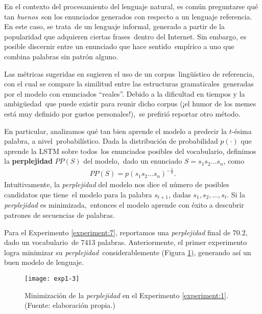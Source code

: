 En el contexto del procesamiento del lenguaje natural, es común preguntarse qué tan \emph{buenos}\
son los enunciados generados con respecto a un lenguaje referencia. En este caso, se trata\
de un lenguaje informal, generado a partir de la popularidad que adquieren ciertas frases\
dentro del Internet. Sin embargo, es posible discernir entre un enunciado que hace sentido\
empírico a uno que combina palabras sin patrón alguno.\par
Las métricas sugeridas en \cite{DBLP:journals/corr/VinyalsTBE16} sugieren el uso de un corpus\
lingüístico de referencia, con el cual se compare la similitud entre las estructuras gramaticales\
generadas por el modelo con enunciados ``reales''. Debido a la dificultad en tiempos y la ambigüedad\
que puede existir para reunir dicho corpus (¡el humor de los memes está muy definido por gustos personales!),\
se prefirió reportar otro método.\par
En particular, analizamos qué tan bien aprende el modelo a predecir la $t$-ésima palabra, a nivel\
probabilístico. Dada la distribución de probabilidad $p(\cdot)$ que aprende la LSTM sobre todos\
los enunciados posibles del vocabulario, definimos la \textbf{perplejidad} $PP(S)$ del modelo,\
dado un enunciado $S = s_1 s_2 \ldots s_n$, como
\begin{align}
  PP(S) = p(s_1 s_2 \ldots s_n) ^{-\frac{1}{n}}.
\end{align}
Intuitivamente, la \emph{perplejidad} del modelo nos dice el número de posibles candidatos que tiene\
el modelo para la palabra $s_{t+1}$, dadas $s_1, s_2, \ldots, s_t$. Si la \emph{perplejidad} es minimizada,\
entonces el modelo aprende con éxito a descubrir patrones de secuencias de palabras.\par
Para el Experimento \ref{experiment:7}, reportamos una \emph{perplejidad} final de $70.2$, dado un vocabulario\
de 7413 palabras. Anteriormente, el primer experimento logra minimizar su \emph{perplejidad}\
considerablemente (Figura \ref{eval:exp1}), generando así un buen modelo de lenguaje.

\begin{figure}[h]
  \texttt{[image: exp1-3]}
  \caption{
    Minimización de la \emph{perplejidad} en el Experimento \ref{experiment:1}.
    (Fuente: elaboración propia.)
  }
  \label{eval:exp1}
\end{figure}
